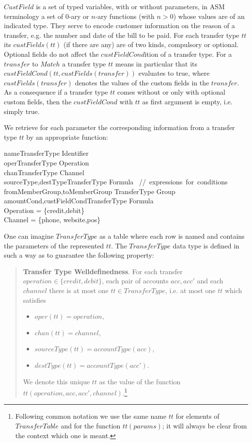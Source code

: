 $CustField$ is a set of typed variables, with or without parameters, in ASM terminology a set of 0-ary or $n$-ary functions (with $n>0$) whose values are of an indicated type. They serve to encode customer information on the reason of a transfer, e.g. the number and date of the bill to be paid. For each transfer type $tt$ its $custFields(tt)$ (if there are any) are of two kinds, compulsory or optional. Optional fields do not affect the $custFieldCond$ition of a transfer type. For a $transfer$ to $Match$ a transfer type $tt$ means in particular that its $custFieldCond(tt,custFields(transfer))$ evaluates to true, where $custFields(transfer)$ denotes the values of the custom fields in the $transfer$. As a consequence if a transfer type $tt$ comes without or only with optional custom fields, then the $custFieldCond$ with $tt$ as first argument is empty, i.e. simply true.

We retrieve for each parameter the corresponding information from a transfer type $tt$ by an appropriate function:

\begin{asm}
name\colon TransferType \rightarrow Identifier \\
oper\colon TransferType \rightarrow Operation\\
chan\colon TransferType \rightarrow Channel \\
sourceType,destType\colon TransferType \rightarrow Formula 
       \mbox{ // expressions for conditions}\\
fromMemberGroup,toMemberGroup \colon TransferType \rightarrow Group \\
amountCond,custFieldCond\colon TransferType \rightarrow Formula\\
\WHERE \+
    Operation = \{credit,debit\} \\
    Channel = \{phone, website,pos\}
\end{asm} 

One can imagine $TransferType$ as a table where each row is named and contains the parameters of the represented $tt$. The $TransferType$ data type is defined in such a way as to guarantee the following property: 
\begin{quote} 
	{\bf Transfer Type Welldefinedness}. For each transfer $operation \in \{credit,debit\}$, each pair of accounts $acc,acc'$ and each $channel$ there is at most one $tt \in TransferType$, i.e. at most one $tt$ which satisfies
	\begin{itemize}
		\item $oper(tt) = operation$,
		\item $chan(tt)=channel$,
		\item $sourceType(tt)=accountType(acc)$,
		\item $destType(tt)=accountType(acc')$.
	\end{itemize} 
We denote this unique $tt$ as the value of the function $tt(operation,acc,acc',channel)$.\footnote{Following common notation we use the same name $tt$ for elements of $TransferTable$ and for the function $tt(params)$; it will always be clear from the context which one is meant.}
\end{quote}



